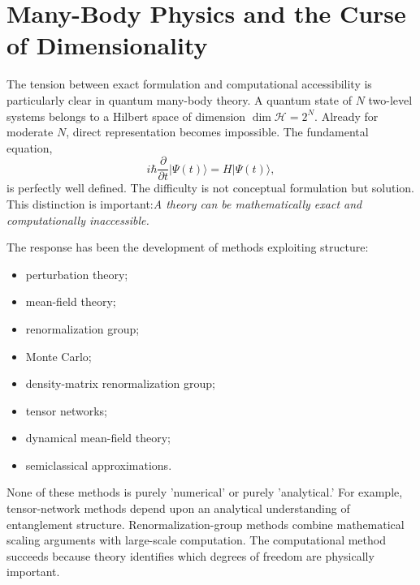 \section{ Many-Body Physics and the Curse of Dimensionality}
The tension between exact formulation and computational accessibility is
particularly clear in quantum many-body theory.
A quantum state of $N$ two-level systems belongs to a Hilbert space of dimension
$\dim\mathcal{H}=2^N$.
Already for moderate $N$, direct representation becomes impossible.
The fundamental equation,
\[i\hbar\frac{\partial}{\partial t}|\Psi(t)\rangle=H|\Psi(t)\rangle,\]
is perfectly well defined.
The difficulty is not conceptual formulation but solution.
This distinction is important:\emph{A theory can be mathematically exact 
and computationally inaccessible.}

The response has been the development of methods exploiting structure:
\begin{itemize}
\item perturbation theory;
\item mean-field theory;
\item renormalization group;
\item Monte Carlo;
\item density-matrix renormalization group;
\item tensor networks;
\item dynamical mean-field theory;
\item semiclassical approximations.
\end{itemize}
None of these methods is purely 'numerical' or purely 'analytical.'
For example, tensor-network methods depend upon an analytical understanding of
entanglement structure. Renormalization-group methods combine mathematical
scaling arguments with large-scale computation.
The computational method succeeds because theory identifies which degrees of
freedom are physically important.

